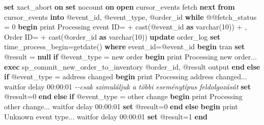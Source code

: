 \documentclass[
  magyar,
]{article}
\newenvironment{Shaded}{}{}
\newcommand{\CommentTok}[1]{\textcolor[rgb]{0.38,0.63,0.69}{\textit{#1}}}
\newcommand{\ControlFlowTok}[1]{\textcolor[rgb]{0.00,0.44,0.13}{\textbf{#1}}}
\newcommand{\DataTypeTok}[1]{\textcolor[rgb]{0.56,0.13,0.00}{#1}}
\newcommand{\DecValTok}[1]{\textcolor[rgb]{0.25,0.63,0.44}{#1}}
\newcommand{\FunctionTok}[1]{\textcolor[rgb]{0.02,0.16,0.49}{#1}}
\newcommand{\KeywordTok}[1]{\textcolor[rgb]{0.00,0.44,0.13}{\textbf{#1}}}
\newcommand{\NormalTok}[1]{#1}
\newcommand{\OperatorTok}[1]{\textcolor[rgb]{0.40,0.40,0.40}{#1}}
\newcommand{\StringTok}[1]{\textcolor[rgb]{0.25,0.44,0.63}{#1}}
\begin{document}
\begin{Shaded}
\begin{Highlighting}[]
\KeywordTok{set}\NormalTok{ xact\_abort }\KeywordTok{on}
\KeywordTok{set}\NormalTok{ nocount }\KeywordTok{on}
\KeywordTok{open}\NormalTok{ cursor\_events}
\NormalTok{fetch }\KeywordTok{next} \KeywordTok{from}\NormalTok{ cursor\_events }\KeywordTok{into}\NormalTok{ @event\_id, @event\_type, @order\_id}
\ControlFlowTok{while}\NormalTok{ @@fetch\_status }\OperatorTok{=} \DecValTok{0}
\ControlFlowTok{begin}
\NormalTok{    print }\StringTok{\textquotesingle{}Processing event ID=\textquotesingle{}} \OperatorTok{+} \FunctionTok{cast}\NormalTok{(@event\_id }\KeywordTok{as} \DataTypeTok{varchar}\NormalTok{(}\DecValTok{10}\NormalTok{)) }\OperatorTok{+} \StringTok{\textquotesingle{}, Order ID=\textquotesingle{}} \OperatorTok{+}
\FunctionTok{cast}\NormalTok{(@order\_id }\KeywordTok{as} \DataTypeTok{varchar}\NormalTok{(}\DecValTok{10}\NormalTok{))}
    \KeywordTok{update}\NormalTok{ order\_log }\KeywordTok{set}\NormalTok{ time\_process\_begin}\OperatorTok{=}\NormalTok{getdate() }\KeywordTok{where}\NormalTok{ event\_id}\OperatorTok{=}\NormalTok{@event\_id}
    \ControlFlowTok{begin}\NormalTok{ tran}
    \KeywordTok{set}\NormalTok{ @result }\OperatorTok{=} \KeywordTok{null}
    \ControlFlowTok{if}\NormalTok{ @event\_type }\OperatorTok{=} \StringTok{\textquotesingle{}new order\textquotesingle{}} \ControlFlowTok{begin}
\NormalTok{        print }\StringTok{\textquotesingle{}  Processing new order...\textquotesingle{}}
        \KeywordTok{exec}\NormalTok{ sp\_commit\_new\_order\_to\_inventory @order\_id, @result output}
    \ControlFlowTok{end} \ControlFlowTok{else} \ControlFlowTok{if}\NormalTok{ @event\_type }\OperatorTok{=} \StringTok{\textquotesingle{}address changed\textquotesingle{}} \ControlFlowTok{begin}
\NormalTok{        print }\StringTok{\textquotesingle{}  Processing address changed...\textquotesingle{}}
\NormalTok{        waitfor delay }\StringTok{\textquotesingle{}00:00:01\textquotesingle{}}  \CommentTok{{-}{-}csak szimuláljuk a többi eseménytípus feldolgozását}
        \KeywordTok{set}\NormalTok{ @result}\OperatorTok{=}\DecValTok{0}
    \ControlFlowTok{end} \ControlFlowTok{else} \ControlFlowTok{if}\NormalTok{ @event\_type }\OperatorTok{=} \StringTok{\textquotesingle{}other change\textquotesingle{}} \ControlFlowTok{begin}
\NormalTok{        print }\StringTok{\textquotesingle{}  Processing other change...\textquotesingle{}}
\NormalTok{        waitfor delay }\StringTok{\textquotesingle{}00:00:01\textquotesingle{}}
        \KeywordTok{set}\NormalTok{ @result}\OperatorTok{=}\DecValTok{0}
    \ControlFlowTok{end} \ControlFlowTok{else} \ControlFlowTok{begin}
\NormalTok{        print }\StringTok{\textquotesingle{}  Unknown event type...\textquotesingle{}}
\NormalTok{        waitfor delay }\StringTok{\textquotesingle{}00:00:01\textquotesingle{}}
        \KeywordTok{set}\NormalTok{ @result}\OperatorTok{=}\DecValTok{1}
    \ControlFlowTok{end}


\end{Highlighting}
\end{Shaded}
\end{document}
